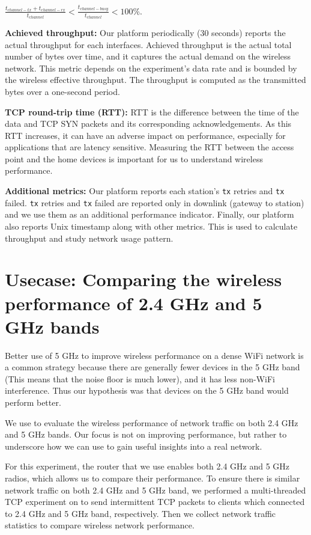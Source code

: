 \(\frac{t_{channel-tx} + t_{channel-rx}}{t_{channel}} < \frac{t_{channel-busy}}{t_{channel}} < 100\%\).

\textbf{Achieved throughput:} Our platform periodically (30 seconds) reports the actual throughput for each interfaces. Achieved throughput is the actual total number of bytes over time, and it captures the actual demand on the wireless network. This metric depends on the experiment's data rate and is bounded by the wireless effective throughput. The throughput is computed as the transmitted bytes over a one-second period.

\textbf{TCP round-trip time (RTT):} RTT is the difference between the time of the data and TCP SYN packets and its corresponding acknowledgements. As this RTT increases, it can have an adverse impact on performance, especially for applications that are latency sensitive. Measuring the RTT between the access point and the home devices is important for us to understand wireless performance.

\textbf{Additional metrics:} Our platform reports each station's \texttt{tx} retries and \texttt{tx} failed. \texttt{tx} retries and \texttt{tx} failed are reported only in downlink (gateway to station) and we use them as an additional performance indicator. Finally, our platform also reports Unix timestamp along with other metrics. This is used to calculate throughput and study network usage pattern. 

\section{Usecase: Comparing the wireless performance of 2.4 GHz and 5 GHz bands}
\label{sec.usecase1}

Better use of 5 GHz to improve wireless performance on a dense WiFi network is a common strategy because there are generally fewer devices in the 5 GHz band (This means that the noise floor is much lower), and it has less non-WiFi interference. Thus our hypothesis was that devices on the 5 GHz band would perform better.

We use \sysname to evaluate the wireless performance of network traffic on both 2.4 GHz and 5 GHz bands. Our focus is not on improving performance, but rather to underscore how we can use \sysname to gain useful insights into a real network.

For this experiment, the router that we use enables both 2.4 GHz and 5 GHz radios, which allows us to compare their performance. To ensure there is similar network traffic on both 2.4 GHz and 5 GHz band, we performed a multi-threaded TCP experiment on \sysname to send intermittent TCP packets to clients which connected to 2.4 GHz and 5 GHz band, respectively. Then we collect network traffic statistics to compare wireless network performance.

